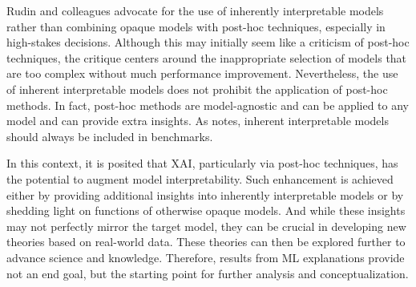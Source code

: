 Rudin and colleagues \cite{Rudin2019StopInstead} advocate for the use of inherently interpretable models rather than combining opaque models with post-hoc techniques, especially in high-stakes decisions. Although this may initially seem like a criticism of post-hoc techniques, the critique centers around the inappropriate selection of models that are too complex without much performance improvement. Nevertheless, the use of inherent interpretable models does not prohibit the application of post-hoc methods. In fact, post-hoc methods are model-agnostic and can be applied to any model and can provide extra insights. As \cite{Molnar2022Model-agnosticLearning} notes, inherent interpretable models should always be included in benchmarks. 

In this context, it is posited that \gls{XAI}, particularly via post-hoc techniques, has the potential to augment model interpretability. Such enhancement is achieved either by providing additional insights into inherently interpretable models or by shedding light on functions of otherwise opaque models. And while these insights may not perfectly mirror the target model, they can be crucial in developing new theories based on real-world data. These theories can then be explored further to advance science and knowledge.
Therefore, results from ML explanations provide not an end goal, but the starting point for further analysis and conceptualization.









